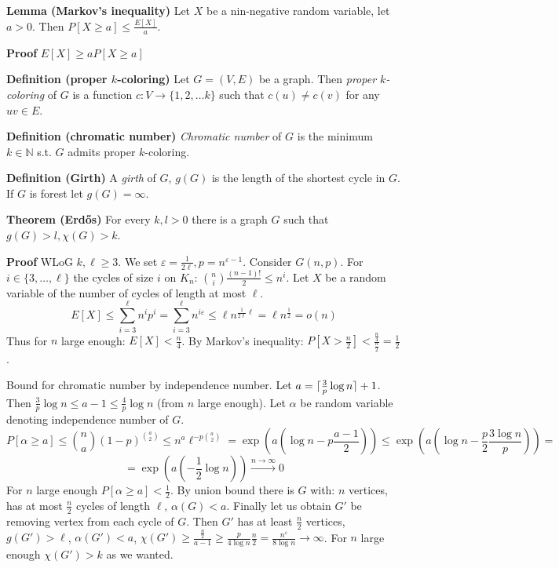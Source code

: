 \documentclass[a4paper]{article}
\DeclarePairedDelimiter\ceil{\lceil}{\rceil}
\begin{document}
\textbf{Lemma (Markov's inequality)}
Let $X$ be a nin-negative random variable, let $a > 0$.
Then $P[X \geq a] \leq \frac{E[X]}{a}$.

\textbf{Proof}
$E[X] \geq a P[X \geq a]$

\textbf{Definition (proper $k$-coloring)}
Let $G = (V,E)$ be a graph.
Then \emph{proper $k$-coloring} of $G$ is a function $c: V \rightarrow \{1, 2, \ldots k\}$ such that $c(u) \neq c(v)$ for any $uv \in E$.

\textbf{Definition (chromatic number)}
\emph{Chromatic number} of $G$ is the minimum $k \in \mathbb{N}$ s.t. $G$ admits proper $k$-coloring.

\textbf{Definition (Girth)}
A \emph{girth} of $G$, $g(G)$ is the length of the shortest cycle in $G$.
If $G$ is forest let $g(G) = \infty$.

\textbf{Theorem (Erdős)}
For every $k,l > 0$ there is a graph $G$ such that $g(G) > l, \chi(G) > k$.

\textbf{Proof}
WLoG $k,\ell \geq 3$.
We set $\varepsilon = \frac{1}{2\ell}, p = n^{\varepsilon - 1}$.
Consider $G(n,p)$.
For $i \in \{3, \ldots, \ell\}$ the cycles of size $i$ on $K_n$: ${n \choose i} \frac{(n-1)!}{2} \leq n^i$.
Let $X$ be a random variable of the number of cycles of length at most $\ell$.
$$E[X] \leq \sum_{i=3}^\ell n^ip^i = \sum_{i=3}^\ell n^{i\varepsilon} \leq \ell n^{\frac{1}{2\ell}\ell} = \ell n^\frac{1}{2} = o(n)$$
Thus for $n$ large enough: $E[X] < \frac{n}{4}$.
By Markov's inequality: $P[X > \frac{n}{2}] < \frac{\frac{n}{4}}{\frac{n}{2}} = \frac{1}{2}$.

Bound for chromatic number by independence number.
Let $a = \ceil{\frac{3}{p} \log n} + 1$.
Then $\frac{3}{p} \log n \leq a - 1 \leq \frac{4}{p} \log n$ (from $n$ large enough).
Let $\alpha$ be random variable denoting independence number of $G$.
$$P\left[\alpha \geq a\right] \leq {n \choose a} \left(1 - p\right)^{a \choose 2} \leq n^a\ell^{-p{a \choose 2}}
= \exp\left(a\left(\log n - p \frac{a-1}{2}\right)\right) \leq \exp\left(a\left(\log n - \frac{p}{2} \frac{3 \log n}{p}\right)\right) =$$
$$= \exp\left(a\left(-\frac{1}{2} \log n\right)\right) \stackrel{n \rightarrow \infty}{\rightarrow} 0$$
For $n$ large enough $P[\alpha \geq a] < \frac{1}{2}$.
By union bound there is $G$ with: $n$ vertices, has at most $\frac{n}{2}$ cycles of length $\ell$, $\alpha(G) < a$.
Finally let us obtain $G'$ be removing vertex from each cycle of $G$.
Then $G'$ has at least $\frac{n}{2}$ vertices, $g(G') > \ell$, $\alpha(G') < a$, $\chi(G') \geq \frac{\frac{n}{2}}{a-1} \geq \frac{p}{4 \log n} \frac{n}{2} = \frac{n^{\varepsilon}}{8 \log n} \rightarrow \infty$.
For $n$ large enough $\chi(G') > k$ as we wanted.
\end{document}
